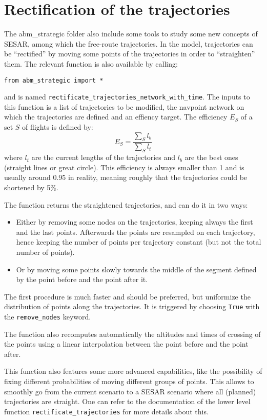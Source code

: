 \documentclass[12pt]{article}
\begin{document}
\section{Rectification of the trajectories}
\label{sec:rectification}

The abm\_strategic folder also include some tools to study some new concepts of SESAR, among which the free-route trajectories. In the model, trajectories can be ``rectified'' by moving some points of the trajectories in order to ``straighten'' them. The relevant function is also available by calling:
\begin{verbatim}
from abm_strategic import *
\end{verbatim}
and is named \verb|rectificate_trajectories_network_with_time|. The inputs to this function is a list of trajectories to be modified, the navpoint network on which the trajectories are defined and an effiency target. The efficiency $E_S$ of a set $S$ of flights is defined by:
$$
E_S = \frac{\sum_S l_b}{\sum_S l_t}
$$
where $l_t$ are the current lengths of the trajectories and $l_b$ are the best ones (straight lines or great circle). This efficiency is always smaller than 1 and is usually around 0.95 in reality, meaning roughly that the trajectories could be shortened by 5\%.

The function returns the straightened trajectories, and can do it in two ways:
\begin{itemize}
\item Either by removing some nodes on the trajectories, keeping always the first and the last points. Afterwards the points are resampled on each trajectory, hence keeping the number of points per trajectory constant (but not the total number of points).
\item Or by moving some points slowly towards the middle of the segment defined by the point before and the point after it.
\end{itemize}
The first procedure is much faster and should be preferred, but uniformize the distribution of points along the trajectories. It is triggered by choosing \verb|True| with the \verb|remove_nodes| keyword.

The function also recomputes automatically the altitudes and times of crossing of the points using a linear interpolation between the point before and the point after.

This function also features some more advanced capabilities, like the possibility of fixing different probabilities of moving different groups of points. This allows to smoothly go from the current scenario to a SESAR scenario where all (planned) trajectories are straight. One can refer to the documentation of the lower level function  \verb|rectificate_trajectories| for more details about this.
\\
\end{document}
